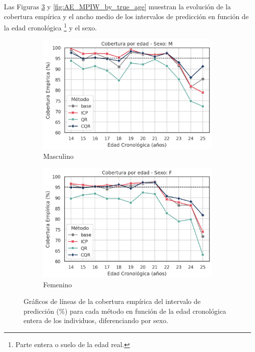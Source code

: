Las Figuras \ref{fig:AE_EC_by_true_age} y \ref{fig:AE_MPIW_by_true_age} muestran la evolución de la cobertura empírica y el ancho medio de los intervalos de predicción en función de la edad cronológica %
\footnote{
    Parte entera o suelo de la edad real.
} y el sexo.


\begin{figure}[h]
    \centering
    
    \begin{subfigure}[b]{0.49\textwidth}
        \centering
        \includegraphics[width=\textwidth]{capitulos/cap_05/imagenes/AE_EC_by_true_age_Male.png}
        \caption{Masculino}
        \label{fig:AE_EC_by_true_age_M}
    \end{subfigure}
    \hfill
    \begin{subfigure}[b]{0.49\textwidth}
        \centering
        \includegraphics[width=\textwidth]{capitulos/cap_05/imagenes/AE_EC_by_true_age_Female.png}
        \caption{Femenino}
        \label{fig:AE_EC_by_true_age_F}
    \end{subfigure}

    \caption[
        Problema de estimación de edad: 
        Gráficos de líneas de la cobertura empírica del intervalo de predicción (\%) para cada método en función de la edad cronológica entera de los individuos, diferenciando por sexo.
    ]{
        Gráficos de líneas de la cobertura empírica del intervalo de predicción (\%) para cada método en función de la edad cronológica entera de los individuos, diferenciando por sexo.
    }
    \label{fig:AE_EC_by_true_age}
\end{figure}


